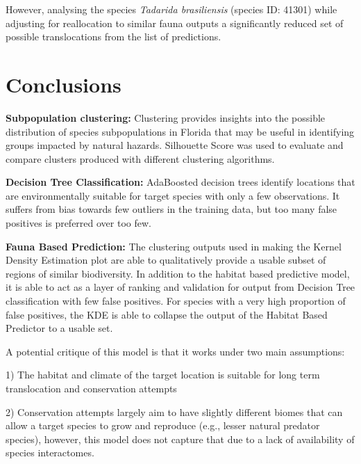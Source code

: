 \documentclass{article}
\begin{document}
However, analysing the species \textit{Tadarida brasiliensis} (species ID: 41301) while adjusting for reallocation to similar fauna outputs a significantly reduced set of possible translocations from the list of predictions. 

\section{Conclusions}
\textbf{Subpopulation clustering:} Clustering provides insights into the possible distribution of species subpopulations in Florida that may be useful in identifying groups impacted by natural hazards. Silhouette Score was used to evaluate and compare clusters produced with different clustering algorithms.

\textbf{Decision Tree Classification:}
AdaBoosted decision trees identify locations that are environmentally suitable for target species with only a few observations. It suffers from bias towards few outliers in the training data, but too many false positives is preferred over too few.

\textbf{Fauna Based Prediction:} The clustering outputs used in making the Kernel Density Estimation plot are able to qualitatively provide a usable subset of regions of similar biodiversity. In addition to the habitat based predictive model, it is able to act as a layer of ranking and validation for output from Decision Tree classification with few false positives. For species with a very high proportion of false positives, the KDE is able to collapse the output of the Habitat Based Predictor to a usable set. 

A potential critique of this model is that it works under two main assumptions: 

1) The habitat and climate of the target location is suitable for long term translocation and conservation attempts

2) Conservation attempts largely aim to have slightly different biomes that can allow a target species to grow and reproduce (e.g., lesser natural predator species), however, this model does not capture that due to a lack of availability of species interactomes\cite{MORRIS2021e01630}.

\newpage
\end{document}
